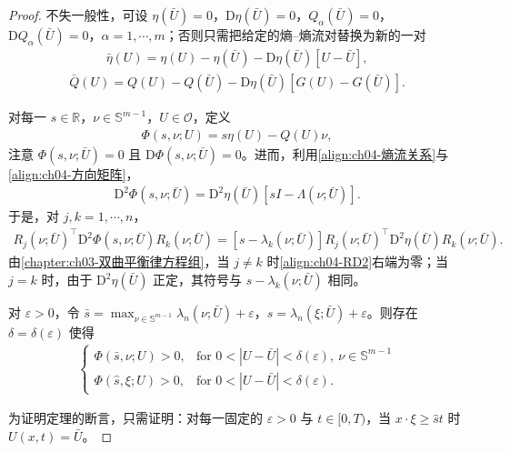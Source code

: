 ﻿\documentclass[../../main.tex]{subfiles}
\begin{document}
\begin{proof}
不失一般性，可设 $\eta(\bar{U})=0$，$\mathrm{D}\eta(\bar{U})=0$，$Q_{\alpha}(\bar{U})=0$，$\mathrm{D}Q_{\alpha}(\bar{U})=0$，$\alpha=1,\cdots,m$；否则只需把给定的熵--熵流对替换为新的一对
\begin{align}
\bar{\eta}(U)=\eta(U)-\eta(\bar{U})-\mathrm{D}\eta(\bar{U})[U-\bar{U}],
\label{align:ch04-eta规范化}
\end{align}
\begin{align}
\bar{Q}(U)=Q(U)-Q(\bar{U})-\mathrm{D}\eta(\bar{U})[G(U)-G(\bar{U})].
\label{align:ch04-Q规范化}
\end{align}

对每一 $s\in\mathbb{R}$，$\nu\in\mathbb{S}^{m-1}$，$U\in\mathcal{O}$，定义
\begin{align}
\Phi(s,\nu;U)=s\eta(U)-Q(U)\nu,
\label{align:ch04-Phi}
\end{align}
注意 $\Phi(s,\nu;\bar{U})=0$ 且 $\mathrm{D}\Phi(s,\nu;\bar{U})=0$。进而，利用\eqref{align:ch04-熵流关系}与\eqref{align:ch04-方向矩阵}，
\begin{align}
\mathrm{D}^{2}\Phi(s,\nu;\bar{U})=\mathrm{D}^{2}\eta(\bar{U})[sI-\Lambda(\nu;\bar{U})].
\label{align:ch04-D2Phi}
\end{align}
于是，对 $j,k=1,\cdots,n$，
\begin{align}
R_{j}(\nu;\bar{U})^{\top}\mathrm{D}^{2}\Phi(s,\nu;\bar{U})R_{k}(\nu;\bar{U})=[s-\lambda_{k}(\nu;\bar{U})]R_{j}(\nu;\bar{U})^{\top}\mathrm{D}^{2}\eta(\bar{U})R_{k}(\nu;\bar{U}).
\label{align:ch04-RD2}
\end{align}
由\cref{chapter:ch03-双曲平衡律方程组}，当 $j\neq k$ 时\eqref{align:ch04-RD2}右端为零；当 $j=k$ 时，由于 $\mathrm{D}^{2}\eta(\bar{U})$ 正定，其符号与 $s-\lambda_{k}(\nu;\bar{U})$ 相同。


对 $\varepsilon>0$，令 $\bar{s}=\max_{\nu\in\mathbb{S}^{m-1}}\lambda_{n}(\nu;\bar{U})+\varepsilon$，$\hat{s}=\lambda_{n}(\xi;\bar{U})+\varepsilon$。则存在 $\delta=\delta(\varepsilon)$ 使得
\begin{align}
\begin{cases}
\Phi(\bar{s},\nu;U)>0,&\text{for }0<|U-\bar{U}|<\delta(\varepsilon),\ \nu\in\mathbb{S}^{m-1}\\
\Phi(\hat{s},\xi;U)>0,&\text{for }0<|U-\bar{U}|<\delta(\varepsilon).
\end{cases}
\label{align:ch04-Phi正}
\end{align}

为证明定理的断言，只需证明：对每一固定的 $\varepsilon>0$ 与 $t\in[0,T)$，当 $x\cdot\xi\geqslant\hat{s}t$ 时 $U(x,t)=\bar{U}$。


\end{proof}
\end{document}
